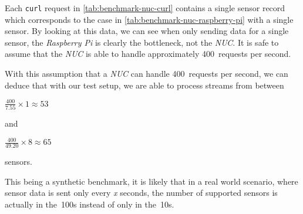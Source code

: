 Each \texttt{curl} request in \autoref{tab:benchmark-nuc-curl} contains a single sensor record which
corresponds to the case in \autoref{tab:benchmark-nuc-raspberry-pi} with a single sensor. By looking
at this data, we can see when only sending data for a single sensor, the \textit{Raspberry Pi} is
clearly the bottleneck, not the \textit{NUC}. It is safe to assume that the \textit{NUC} is able to
handle approximately 400~requests per second.

With this assumption that a \textit{NUC} can handle 400~requests per second, we can deduce that with
our test setup, we are able to process streams from between

$\frac{400}{7.55} \times 1 \approx 53$

and

$\frac{400}{49.20} \times 8 \approx 65$

sensors.

This being a synthetic benchmark, it is likely that in a real world scenario, where sensor data is
sent only every \textit{x} seconds, the number of supported sensors is actually in the~100s instead
of only in the~10s.
